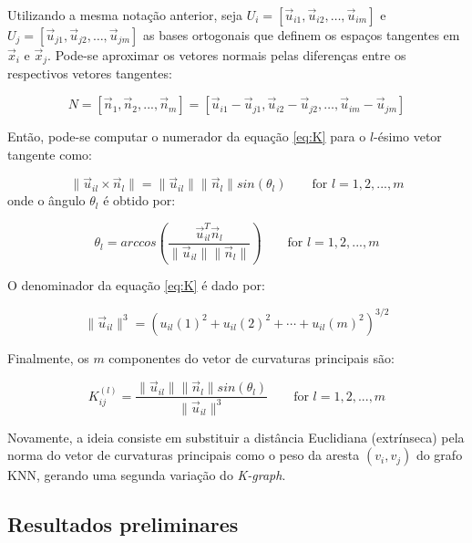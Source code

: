\documentclass[a4paper,12pt]{article}
\begin{document}
Utilizando a mesma notação anterior, seja $U_i = \left[ \vec{u}_{i1} , \vec{u}_{i2} , \ldots, \vec{u}_{im} \right]$ e $U_j = \left[ \vec{u}_{j1} , \vec{u}_{j2} , \ldots, \vec{u}_{jm} \right]$ as bases ortogonais que definem os espaços tangentes em $\vec{x}_i$ e $\vec{x}_j$. Pode-se aproximar os vetores normais pelas diferenças entre os respectivos vetores tangentes:

\begin{equation}
	N = \left[ \vec{n}_1 , \vec{n}_2 , ... , \vec{n}_m \right] = \left[ \vec{u}_{i1} - \vec{u}_{j1}, \vec{u}_{i2} - \vec{u}_{j2}, \ldots, \vec{u}_{im} - \vec{u}_{jm} \right]
\end{equation}

Então, pode-se computar o numerador da equação \eqref{eq:K} para o $l$-ésimo vetor tangente como:

\begin{equation}
	\lVert \vec{u}_{il} \times \vec{n}_l \rVert = \lVert \vec{u}_{il} \rVert \lVert \vec{n}_{l} \rVert sin(\theta_l) \qquad \text{for } l = 1, 2, ..., m
\end{equation} onde o ângulo $\theta_l$ é obtido por:

\begin{equation}
	\theta_l = arccos \left( \frac{ \vec{u}_{il}^T \vec{n}_l }{ \lVert \vec{u}_{il} \rVert \lVert \vec{n}_{l} \rVert} \right) \qquad \text{for } l = 1, 2, ..., m
\end{equation}

O denominador da equação \eqref{eq:K} é dado por:

\begin{equation}
	\lVert \vec{u}_{il} \rVert^3 = \left( u_{il}(1)^2 + u_{il}(2)^2 + \cdots + u_{il}(m)^2 \right)^{3/2}
\end{equation}

Finalmente, os $m$ componentes do vetor de curvaturas principais são:

\begin{equation}
	K_{ij}^{(l)} = \frac{ \lVert \vec{u}_{il} \rVert \lVert \vec{n}_{l} \rVert sin(\theta_l)}{ \lVert \vec{u}_{il} \rVert^3 } \qquad \text{for } l = 1, 2, ..., m
\end{equation}

Novamente, a ideia consiste em substituir a distância Euclidiana (extrínseca) pela norma do vetor de curvaturas principais como o peso da aresta $(v_i, v_j)$ do grafo KNN, gerando uma segunda variação do \emph{K-graph}.

\subsection{Resultados preliminares}
\end{document}
